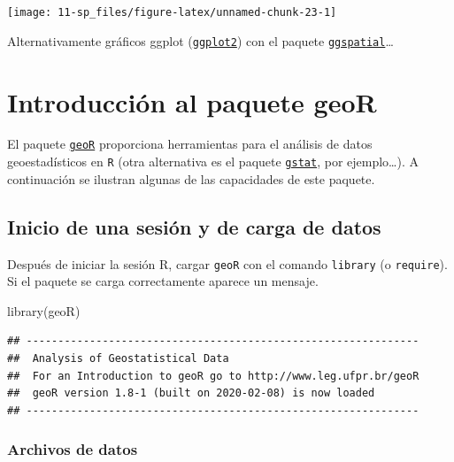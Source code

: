 \documentclass[
  spanish,
]{book}
\newenvironment{Shaded}{\begin{snugshade}}{\end{snugshade}}
\newcommand{\FunctionTok}[1]{\textcolor[rgb]{0.00,0.00,0.00}{#1}}
\newcommand{\NormalTok}[1]{#1}
\theoremstyle{break}
\theoremstyle{definition}
\theoremstyle{definition}
\theoremstyle{definition}
\theoremstyle{definition}
\theoremstyle{remark}
\begin{document}
\begin{center}\texttt{[image: 11-sp\_files/figure-latex/unnamed-chunk-23-1]} \end{center}

Alternativamente gráficos ggplot (\href{https://ggplot2.tidyverse.org}{\texttt{ggplot2}}) con el paquete \href{https://paleolimbot.github.io/ggspatial}{\texttt{ggspatial}}\ldots{}

\hypertarget{intro-geoR}{%
\chapter{\texorpdfstring{Introducción al paquete \textbf{geoR}}{Introducción al paquete geoR}}\label{intro-geoR}}

El paquete \href{http://www.leg.ufpr.br/geoR}{\texttt{geoR}} proporciona herramientas para el análisis de datos
geoestadísticos en \texttt{R}
(otra alternativa es el paquete \href{http://r-spatial.github.io/gstat}{\texttt{gstat}}, por ejemplo\ldots).
A continuación se ilustran algunas de las capacidades de este paquete.

\hypertarget{inicio-de-una-sesiuxf3n-y-de-carga-de-datos}{%
\section{Inicio de una sesión y de carga de datos}\label{inicio-de-una-sesiuxf3n-y-de-carga-de-datos}}

Después de iniciar la sesión R, cargar \texttt{geoR} con el comando \texttt{library} (o
\texttt{require}). Si el paquete se carga correctamente aparece un mensaje.

\begin{Shaded}
\begin{Highlighting}[]
\FunctionTok{library}\NormalTok{(geoR)}
\end{Highlighting}
\end{Shaded}

\begin{verbatim}
## --------------------------------------------------------------
##  Analysis of Geostatistical Data
##  For an Introduction to geoR go to http://www.leg.ufpr.br/geoR
##  geoR version 1.8-1 (built on 2020-02-08) is now loaded
## --------------------------------------------------------------
\end{verbatim}

\hypertarget{archivos-de-datos}{%
\subsection{Archivos de datos}\label{archivos-de-datos}}
\end{document}
